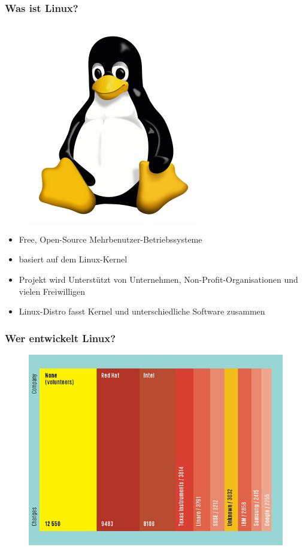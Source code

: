 \begin{frame}
\frametitle{Was ist Linux?}
\begin{figure}
\includegraphics[scale=0.17]{resources/tux.png}
\end{figure}
\begin{itemize}
	\item Free, Open-Source Mehrbenutzer-Betriebssysteme
	\item basiert auf dem Linux-Kernel
	\item Projekt wird Unterstützt von Unternehmen, Non-Profit-Organisationen und vielen Freiwilligen
	\item Linux-Distro fasst Kernel und unterschiedliche Software zusammen
\end{itemize}
\end{frame}

\begin{frame}
\frametitle{Wer entwickelt Linux?}
\begin{figure}
\includegraphics[scale=0.4]{resources/linuxdev.jpg}
\end{figure}
\end{frame}

